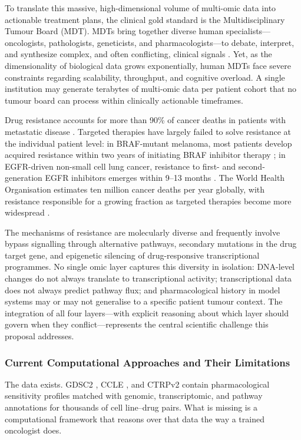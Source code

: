 \documentclass[11pt,letterpaper]{article}
\begin{document}
To translate this massive, high-dimensional volume of multi-omic data into actionable treatment
plans, the clinical gold standard is the Multidisciplinary Tumour Board (MDT). MDTs bring
together diverse human specialists---oncologists, pathologists, geneticists, and
pharmacologists---to debate, interpret, and synthesize complex, and often conflicting, clinical
signals \cite{ref11,ref12,ref18}. Yet, as the dimensionality of biological data grows
exponentially, human MDTs face severe constraints regarding scalability, throughput, and
cognitive overload. A single institution may generate terabytes of multi-omic data per patient
cohort that no tumour board can process within clinically actionable timeframes.

Drug resistance accounts for more than 90\% of cancer deaths in patients with metastatic
disease \cite{ref22}. Targeted therapies have largely failed to solve resistance at the individual
patient level: in BRAF-mutant melanoma, most patients develop acquired resistance within two
years of initiating BRAF inhibitor therapy \cite{ref23}; in EGFR-driven non-small cell lung
cancer, resistance to first- and second-generation EGFR inhibitors emerges within 9--13 months
\cite{ref24}. The World Health Organisation estimates ten million cancer deaths per year globally,
with resistance responsible for a growing fraction as targeted therapies become more widespread
\cite{ref8}.

The mechanisms of resistance are molecularly diverse and frequently involve bypass signalling
through alternative pathways, secondary mutations in the drug target gene, and epigenetic
silencing of drug-responsive transcriptional programmes. No single omic layer captures this
diversity in isolation: DNA-level changes do not always translate to transcriptional activity;
transcriptional data does not always predict pathway flux; and pharmacological history in model
systems may or may not generalise to a specific patient tumour context. The integration of all
four layers---with explicit reasoning about which layer should govern when they
conflict---represents the central scientific challenge this proposal addresses.

\subsubsection{Current Computational Approaches and Their Limitations}

The data exists. GDSC2 \cite{ref20}, CCLE \cite{ref19}, and CTRPv2 contain pharmacological
sensitivity profiles matched with genomic, transcriptomic, and pathway annotations for thousands
of cell line--drug pairs. What is missing is a computational framework that reasons over that
data the way a trained oncologist does.
\end{document}
